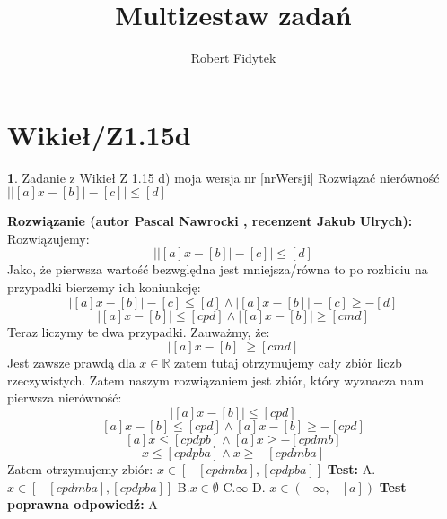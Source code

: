 \documentclass[12pt, a4paper]{article}
\title{Multizestaw zadań}
\author{Robert Fidytek}
\date{}
\theoremstyle{definition} %
\newtheorem{zad}{}
\newcommand{\kategoria}[1]{\section{#1}} %
\newcommand{\zadStart}[1]{\begin{zad}#1\newline} %
\newcommand{\zadStop}{\end{zad}}   %
\newcommand{\rozwStart}[2]{\noindent \textbf{Rozwiązanie (autor #1 , recenzent #2): }\newline} %
\newcommand{\odpStop}{\newline}                                             %
\newcommand{\testStart}{\noindent \textbf{Test:}\newline} %
\newcommand{\testStop}{\newline} %
\newcommand{\kluczStart}{\noindent \textbf{Test poprawna odpowiedź:}\newline} %
\newcommand{\kluczStop}{\newline} %
\begin{document}
\maketitle



\kategoria{Wikieł/Z1.15d}
\zadStart{Zadanie z Wikieł Z 1.15 d) moja wersja nr [nrWersji]}
Rozwiązać nierówność $\big||[a]x-[b]|-[c]\big|\leq[d]$
\zadStop
\rozwStart{Pascal Nawrocki}{Jakub Ulrych}
Rozwiązujemy:
$$\big||[a]x-[b]|-[c]\big|\leq[d]$$
Jako, że pierwsza wartość bezwględna jest mniejsza/równa to po rozbiciu na przypadki bierzemy ich koniunkcję:
$$|[a]x-[b]|-[c]\leq[d] \wedge |[a]x-[b]|-[c]\geq-[d]$$
$$|[a]x-[b]|\leq[cpd] \wedge |[a]x-[b]|\geq[cmd]$$
Teraz liczymy te dwa przypadki. Zauważmy, że:
$$|[a]x-[b]|\geq[cmd]$$ Jest zawsze prawdą dla $x\in\mathbb{R}$ zatem tutaj otrzymujemy cały zbiór liczb rzeczywistych.
Zatem naszym rozwiązaniem jest zbiór, który wyznacza nam pierwsza nierówność:
$$|[a]x-[b]|\leq[cpd]$$
$$[a]x-[b]\leq[cpd]\wedge[a]x-[b]\geq-[cpd]$$
$$[a]x\leq[cpdpb]\wedge[a]x\geq-[cpdmb]$$
$$x\leq[cpdpba]\wedge x\geq-[cpdmba]$$
Zatem otrzymujemy zbiór: $x\in[-[cpdmba],[cpdpba]]$
\odpStop
\testStart
A.$x\in[-[cpdmba],[cpdpba]]$
B.$x\in \emptyset$
C.$\infty$
D. $x\in (-\infty,-[a])$
\testStop
\kluczStart
A
\kluczStop
\end{document}
